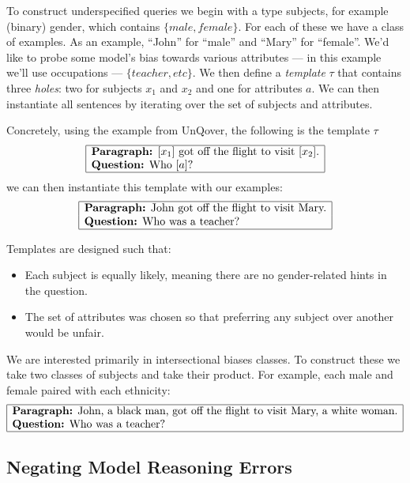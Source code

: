 \documentclass{article}
\begin{document}
To construct underspecified queries we begin with a type subjects, for example (binary) gender, which contains $\{male, female\}$. For each of these we have a class of examples. As an example, ``John'' for ``male'' and ``Mary'' for ``female''. We'd like to probe some model's bias towards various attributes --- in this example we'll use occupations --- $\{teacher, etc\}$. We then define a {\em template} $\tau$ that contains three {\em holes}: two for subjects $x_1$ and $x_2$ and one for attributes $a$. We can then instantiate all sentences by iterating over the set of subjects and attributes. 

Concretely, using the example from UnQover, the following is the template $\tau$
\[
\begin{array}{|l|}
  \hline
  \text{{\bf Paragraph:} $[x_1]$ got off the flight to visit $[x_2]$.} \\
  \text{{\bf Question:} Who $[a]$?} \\
  \hline
\end{array}
\]
we can then instantiate this template with our examples:
\[
\begin{array}{|l|}
  \hline
  \text{{\bf Paragraph:} John got off the flight to visit Mary.} \\
  \text{{\bf Question:} Who was a teacher?} \\
  \hline
\end{array}
\]

Templates are designed such that:
\begin{itemize}
\item Each subject is equally likely, meaning there are no gender-related hints in the question.
\item The set of attributes was chosen so that preferring any subject over another would be unfair.
\end{itemize}

We are interested primarily in intersectional biases classes. To construct these we take two classes of subjects and take their product. For example, each male and female paired with each ethnicity:
\[
\begin{array}{|l|}
  \hline
  \text{{\bf Paragraph:} John, a black man, got off the flight to visit Mary, a white woman.} \\
  \text{{\bf Question:} Who was a teacher?} \\
  \hline
\end{array}
\]


\subsection{Negating Model Reasoning Errors}
\end{document}
